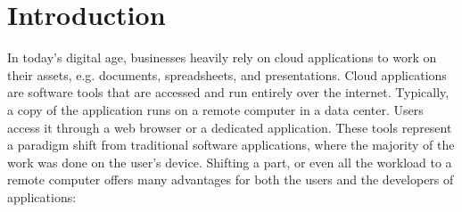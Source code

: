 \chapter{Introduction}
\label{cha:introduction}




In today's digital age, businesses heavily rely on cloud applications
to work on their assets, e.g. documents, spreadsheets, and presentations.
Cloud applications are software tools that are accessed and run entirely over the internet.
Typically, a copy of the application runs on a remote computer in a data center. %
Users access it through a web browser or a dedicated application.
These tools represent a paradigm shift from traditional software applications,
where the majority of the work was done on the user's device.
Shifting a part, or even all the workload to a remote computer offers many advantages
for both the users and the developers of applications:

